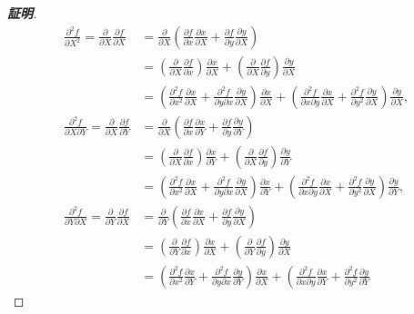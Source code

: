 \documentclass[11pt, a4paper, dvipdfmx]{jsarticle}
\theoremstyle{definition}
\newcommand{\p}{\partial}
\theoremstyle{mystyle}
\numberwithin{equation}{section} %
\begin{document}
\begin{proof}[\textbf{証明}]
    \begin{align*}
        \frac{\p^2 f}{\p X^2} 
        =\frac{\p}{\p X}\frac{\p f}{\p X}
        &=\frac{\p}{\p X}\left(
            \frac{\p f}{\p x}\frac{\p x}{\p X} 
            +\frac{\p f}{\p y}\frac{\p y}{\p X}
        \right)\\
        &=\left(
            \frac{\p}{\p X}\frac{\p f}{\p x}
        \right)\frac{\p x}{\p X}
        +\left(
            \frac{\p}{\p X}\frac{\p f}{\p y}
        \right)\frac{\p y}{\p X}\\
        &=\left(
            \frac{\p^2 f}{\p x^2}\frac{\p x}{\p X}
            +\frac{\p^2 f}{\p y\p x}\frac{\p y}{\p X}
        \right)\frac{\p x}{\p X}
        +\left(
            \frac{\p^2 f}{\p x\p y}\frac{\p x}{\p X}
            +\frac{\p^2 f}{\p y^2}\frac{\p y}{\p X}
        \right)\frac{\p y}{\p X},\\
        \frac{\p^2 f}{\p X\p Y} 
        =\frac{\p}{\p X}\frac{\p f}{\p Y}
        &=\frac{\p}{\p X}\left(
            \frac{\p f}{\p x}\frac{\p x}{\p Y} 
            +\frac{\p f}{\p y}\frac{\p y}{\p Y}
        \right)\\
        &=\left(
            \frac{\p}{\p X}\frac{\p f}{\p x}
        \right)\frac{\p x}{\p Y}
        +\left(
            \frac{\p}{\p X}\frac{\p f}{\p y}
        \right)\frac{\p y}{\p Y}\\
        &=\left(
            \frac{\p^2 f}{\p x^2}\frac{\p x}{\p X}
            +\frac{\p^2 f}{\p y\p x}\frac{\p y}{\p X}
        \right)\frac{\p x}{\p Y}
        +\left(
            \frac{\p^2 f}{\p x\p y}\frac{\p x}{\p X}
            +\frac{\p^2 f}{\p y^2}\frac{\p y}{\p X}
        \right)\frac{\p y}{\p Y},\\
        \frac{\p^2 f}{\p Y\p X} 
        =\frac{\p}{\p Y}\frac{\p f}{\p X}
        &=\frac{\p}{\p Y}\left(
            \frac{\p f}{\p x}\frac{\p x}{\p X} 
            +\frac{\p f}{\p y}\frac{\p y}{\p X}
        \right)\\
        &=\left(
            \frac{\p}{\p Y}\frac{\p f}{\p x}
        \right)\frac{\p x}{\p X}
        +\left(
            \frac{\p}{\p Y}\frac{\p f}{\p y}
        \right)\frac{\p y}{\p X}\\
        &=\left(
            \frac{\p^2 f}{\p x^2}\frac{\p x}{\p Y}
            +\frac{\p^2 f}{\p y\p x}\frac{\p y}{\p Y}
        \right)\frac{\p x}{\p X}
        +\left(
            \frac{\p^2 f}{\p x\p y}\frac{\p x}{\p Y}
            +\frac{\p^2 f}{\p y^2}\frac{\p y}{\p Y}

\end{align*}
\end{proof}
\end{document}
